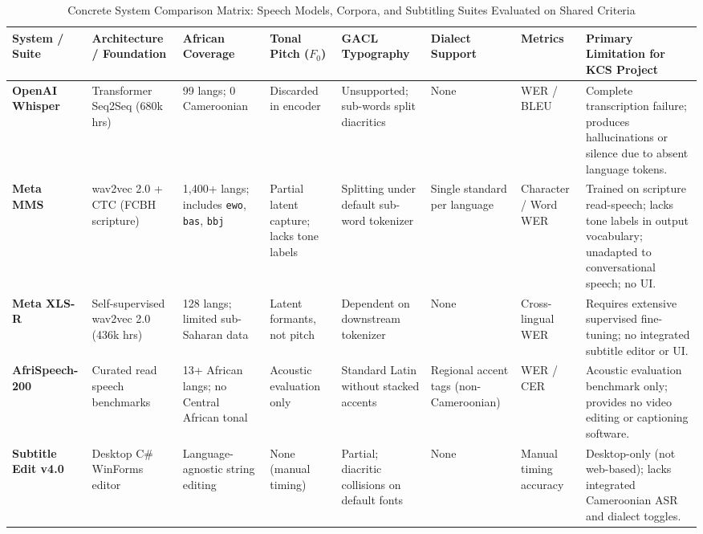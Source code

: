 \documentclass[conference]{IEEEtran}
\begin{document}
\begin{table}[t]
\centering
\scriptsize
\setlength{\tabcolsep}{3.0pt}
\caption{Concrete System Comparison Matrix: Speech Models, Corpora, and Subtitling Suites Evaluated on Shared Criteria}
\label{tab:concrete_systems}
\begin{tabular}{p{2.0cm} p{2.2cm} p{2.2cm} p{1.5cm} p{1.8cm} p{1.5cm} p{1.7cm} >{\raggedright\arraybackslash}p{3.2cm}}
\toprule
\textbf{System / Suite} & \textbf{Architecture / Foundation} & \textbf{African Coverage} & \textbf{Tonal Pitch ($F_0$)} & \textbf{GACL Typography} & \textbf{Dialect Support} & \textbf{Metrics} & \textbf{Primary Limitation for KCS Project} \\
\midrule
\textbf{OpenAI Whisper}~\cite{radford2023robust} & Transformer Seq2Seq (680k hrs) & 99 langs; 0 Cameroonian & Discarded in encoder & Unsupported; sub-words split diacritics & None & WER / BLEU & Complete transcription failure; produces hallucinations or silence due to absent language tokens. \\
\addlinespace
\textbf{Meta MMS}~\cite{conneau2023fleurs} & wav2vec 2.0 + CTC (FCBH scripture) & 1,400+ langs; includes \texttt{ewo}, \texttt{bas}, \texttt{bbj} & Partial latent capture; lacks tone labels & Splitting under default sub-word tokenizer & Single standard per language & Character / Word WER & Trained on scripture read-speech; lacks tone labels in output vocabulary; unadapted to conversational speech; no UI. \\
\addlinespace
\textbf{Meta XLS-R}~\cite{conneau2023fleurs} & Self-supervised wav2vec 2.0 (436k hrs) & 128 langs; limited sub-Saharan data & Latent formants, not pitch & Dependent on downstream tokenizer & None & Cross-lingual WER & Requires extensive supervised fine-tuning; no integrated subtitle editor or UI. \\
\addlinespace
\textbf{AfriSpeech-200}~\cite{conneau2023fleurs} & Curated read speech benchmarks & 13+ African langs; no Central African tonal & Acoustic evaluation only & Standard Latin without stacked accents & Regional accent tags (non-Cameroonian) & WER / CER & Acoustic evaluation benchmark only; provides no video editing or captioning software. \\
\addlinespace
\textbf{Subtitle Edit v4.0} & Desktop C\# WinForms editor & Language-agnostic string editing & None (manual timing) & Partial; diacritic collisions on default fonts & None & Manual timing accuracy & Desktop-only (not web-based); lacks integrated Cameroonian ASR and dialect toggles. \\

\end{tabular}
\end{table}
\end{document}
